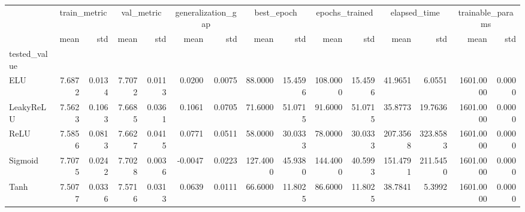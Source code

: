 \begin{tabular}{lrrrrrrrrrrrrrr}
\toprule
 & \multicolumn{2}{c}{train_metric} & \multicolumn{2}{c}{val_metric} & \multicolumn{2}{c}{generalization_gap} & \multicolumn{2}{c}{best_epoch} & \multicolumn{2}{c}{epochs_trained} & \multicolumn{2}{c}{elapsed_time} & \multicolumn{2}{c}{trainable_params} \\
 & mean & std & mean & std & mean & std & mean & std & mean & std & mean & std & mean & std \\
tested_value &  &  &  &  &  &  &  &  &  &  &  &  &  &  \\
\midrule
ELU & 7.6872 & 0.0134 & 7.7072 & 0.0113 & 0.0200 & 0.0075 & 88.0000 & 15.4596 & 108.0000 & 15.4596 & 41.9651 & 6.0551 & 1601.0000 & 0.0000 \\
LeakyReLU & 7.5623 & 0.1063 & 7.6685 & 0.0361 & 0.1061 & 0.0705 & 71.6000 & 51.0715 & 91.6000 & 51.0715 & 35.8773 & 19.7636 & 1601.0000 & 0.0000 \\
ReLU & 7.5856 & 0.0813 & 7.6627 & 0.0415 & 0.0771 & 0.0511 & 58.0000 & 30.0333 & 78.0000 & 30.0333 & 207.3568 & 323.8583 & 1601.0000 & 0.0000 \\
Sigmoid & 7.7075 & 0.0242 & 7.7028 & 0.0036 & -0.0047 & 0.0223 & 127.4000 & 45.9380 & 144.4000 & 40.5993 & 151.4791 & 211.5450 & 1601.0000 & 0.0000 \\
Tanh & 7.5077 & 0.0336 & 7.5716 & 0.0313 & 0.0639 & 0.0111 & 66.6000 & 11.8025 & 86.6000 & 11.8025 & 38.7841 & 5.3992 & 1601.0000 & 0.0000 \\
\bottomrule
\end{tabular}
